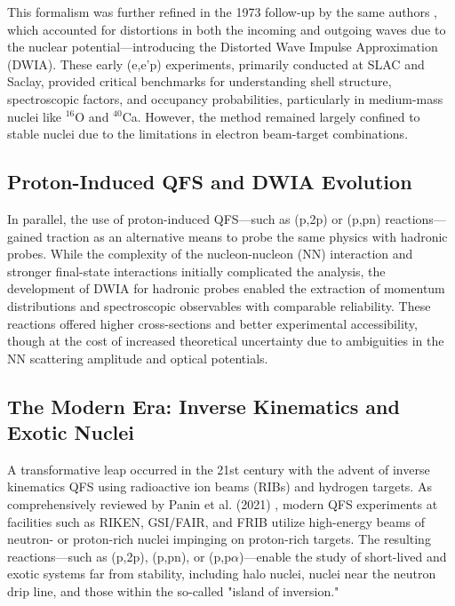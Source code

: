 This formalism was further refined in the 1973 follow-up by the same authors \cite{jacob_quasi-free_1973}, which accounted for distortions in both the incoming and outgoing waves due to the nuclear potential—introducing the Distorted Wave Impulse Approximation (DWIA). These early (e,e'p) experiments, primarily conducted at SLAC and Saclay, provided critical benchmarks for understanding shell structure, spectroscopic factors, and occupancy probabilities, particularly in medium-mass nuclei like $^{16}$O and $^{40}$Ca. However, the method remained largely confined to stable nuclei due to the limitations in electron beam-target combinations.


\subsection{Proton-Induced QFS and DWIA Evolution}

In parallel, the use of proton-induced QFS—such as (p,2p) or (p,pn) reactions—gained traction as an alternative means to probe the same physics with hadronic probes. While the complexity of the nucleon-nucleon (NN) interaction and stronger final-state interactions initially complicated the analysis, the development of DWIA for hadronic probes enabled the extraction of momentum distributions and spectroscopic observables with comparable reliability. These reactions offered higher cross-sections and better experimental accessibility, though at the cost of increased theoretical uncertainty due to ambiguities in the NN scattering amplitude and optical potentials.

\subsection{The Modern Era: Inverse Kinematics and Exotic Nuclei}

A transformative leap occurred in the 21st century with the advent of inverse kinematics QFS using radioactive ion beams (RIBs) and hydrogen targets. As comprehensively reviewed by Panin et al. (2021) \cite{panin_quasi-free_2021}, modern QFS experiments at facilities such as RIKEN, GSI/FAIR, and FRIB utilize high-energy beams of neutron- or proton-rich nuclei impinging on proton-rich targets. The resulting reactions—such as (p,2p), (p,pn), or (p,p$\alpha$)—enable the study of short-lived and exotic systems far from stability, including halo nuclei, nuclei near the neutron drip line, and those within the so-called "island of inversion."

